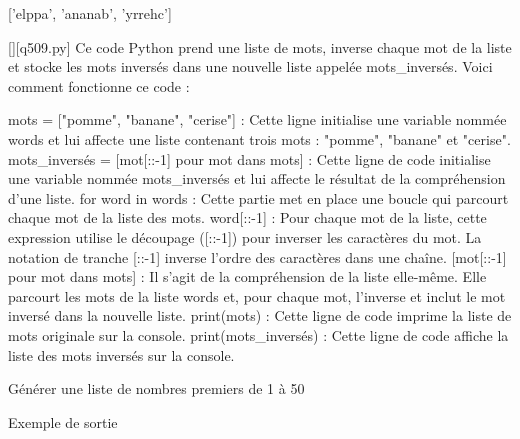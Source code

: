 ['elppa', 'ananab', 'yrrehc']
        \par
        \begin{solution}
            \renewcommand{\nomfichier}{q509.py}
            \pythonfile{\chemincode \nomfichier}[][\nomfichier]
            Ce code Python prend une liste de mots, inverse chaque mot de la liste et stocke les mots inversés dans une nouvelle liste appelée mots_inversés. Voici comment fonctionne ce code :

    mots = ["pomme", "banane", "cerise"] : Cette ligne initialise une variable nommée words et lui affecte une liste contenant trois mots : "pomme", "banane" et "cerise".
    mots_inversés = [mot[::-1] pour mot dans mots] : Cette ligne de code initialise une variable nommée mots_inversés et lui affecte le résultat de la compréhension d'une liste.
        for word in words : Cette partie met en place une boucle qui parcourt chaque mot de la liste des mots.
        word[::-1] : Pour chaque mot de la liste, cette expression utilise le découpage ([::-1]) pour inverser les caractères du mot. La notation de tranche [::-1] inverse l'ordre des caractères dans une chaîne.
        [mot[::-1] pour mot dans mots] : Il s'agit de la compréhension de la liste elle-même. Elle parcourt les mots de la liste words et, pour chaque mot, l'inverse et inclut le mot inversé dans la nouvelle liste.
    print(mots) : Cette ligne de code imprime la liste de mots originale sur la console.
    print(mots_inversés) : Cette ligne de code affiche la liste des mots inversés sur la console.
        \end{solution}
        

        \question
        Générer une liste de nombres premiers de 1 à 50

Exemple de sortie


